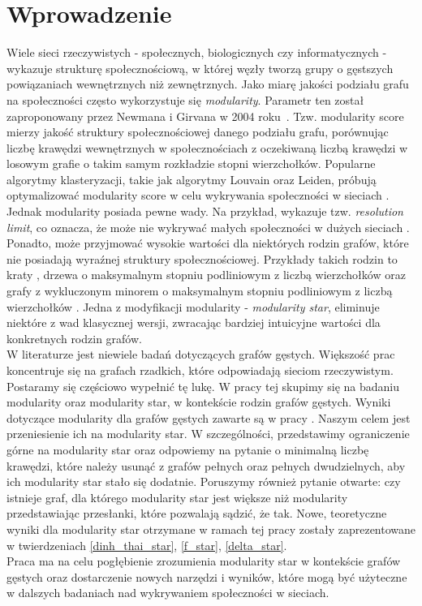 \documentclass[letterpaper,12pt]{article}
\begin{document}
\section*{Wprowadzenie}
Wiele sieci rzeczywistych - społecznych, biologicznych czy informatycznych - wykazuje strukturę społecznościową, w której węzły tworzą grupy o gęstszych powiązaniach wewnętrznych niż zewnętrznych. Jako miarę jakości podziału grafu na społeczności często wykorzystuje się \textit{modularity}. Parametr ten został zaproponowany przez Newmana i Girvana w 2004 roku~\cite{NG04}. Tzw. modularity score mierzy jakość struktury społecznościowej danego podziału grafu, porównując liczbę krawędzi wewnętrznych w społecznościach z oczekiwaną liczbą krawędzi w losowym grafie o takim samym rozkładzie stopni wierzchołków. Popularne algorytmy klasteryzacji, takie jak algorytmy Louvain oraz Leiden, próbują optymalizować modularity score w celu wykrywania społeczności w sieciach \cite{BGLL08, TWE19}.\\
\indent Jednak modularity posiada pewne wady. Na przykład, wykazuje tzw. \textit{resolution limit}, co oznacza, że może nie wykrywać małych społeczności w dużych sieciach \cite{FB07, K24}. Ponadto, może przyjmować wysokie wartości dla niektórych rodzin grafów, które nie posiadają wyraźnej struktury społecznościowej. Przykłady takich rodzin to kraty \cite{K24}, drzewa o maksymalnym stopniu podliniowym z liczbą wierzchołków \cite{MS18} oraz grafy z wykluczonym minorem o maksymalnym stopniu podliniowym z liczbą wierzchołków \cite{LS23}. Jedna z modyfikacji modularity - \textit{modularity star}, eliminuje niektóre z wad klasycznej wersji, zwracając bardziej intuicyjne wartości dla konkretnych rodzin grafów.\\
\indent W literaturze jest niewiele badań dotyczących grafów gęstych. Większość prac koncentruje się na grafach rzadkich, które odpowiadają sieciom rzeczywistym. Postaramy się częściowo wypełnić tę lukę. W pracy tej skupimy się na badaniu modularity oraz modularity star, w kontekście rodzin grafów gęstych. Wyniki dotyczące modularity dla grafów gęstych zawarte są w pracy \cite{MS23}. Naszym celem jest przeniesienie ich na modularity star. W szczególności, przedstawimy ograniczenie górne na modularity star oraz odpowiemy na pytanie o minimalną liczbę krawędzi, które należy usunąć z grafów pełnych oraz pełnych dwudzielnych, aby ich modularity star stało się dodatnie. Poruszymy również pytanie otwarte: czy istnieje graf, dla którego modularity star jest większe niż modularity przedstawiając przesłanki, które pozwalają sądzić, że tak. Nowe, teoretyczne wyniki dla modularity star otrzymane w ramach tej pracy zostały zaprezentowane w twierdzeniach \ref{dinh_thai_star}, \ref{f_star}, \ref{delta_star}.\\
\indent Praca ma na celu pogłębienie zrozumienia modularity star w kontekście grafów gęstych oraz dostarczenie nowych narzędzi i wyników, które mogą być użyteczne w dalszych badaniach nad wykrywaniem społeczności w sieciach.
\newpage
\end{document}
